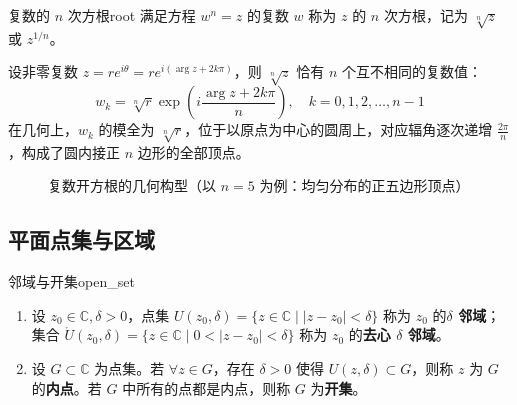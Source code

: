 \documentclass[11pt,a4paper,fontset=fandol]{ctexart}
\theoremstyle{remark}
\begin{document}
\begin{definition}{复数的 $n$ 次方根}{root}
满足方程 $w^n = z$ 的复数 $w$ 称为 $z$ 的 $n$ 次方根，记为 $\sqrt[n]{z}$ 或 $z^{1/n}$。
\end{definition}

设非零复数 $z = r e^{i\theta} = r e^{i(\arg z + 2k\pi)}$，则 $\sqrt[n]{z}$ 恰有 $n$ 个互不相同的复数值：
\begin{equation}
    w_k = \sqrt[n]{r} \exp\left( i \frac{\arg z + 2k\pi}{n} \right), \quad k = 0, 1, 2, \dots, n-1
\end{equation}
在几何上，$w_k$ 的模全为 $\sqrt[n]{r}$，位于以原点为中心的圆周上，对应辐角逐次递增 $\frac{2\pi}{n}$，构成了圆内接正 $n$ 边形的全部顶点。

\begin{figure}[htbp]
\centering
{}
\caption{复数开方根的几何构型（以 $n = 5$ 为例：均匀分布的正五边形顶点）}
\label{fig:roots}
\end{figure}

\subsection{平面点集与区域}

\begin{definition}{邻域与开集}{open_set}
\begin{enumerate}
    \item 设 $z_0 \in \mathbb{C}, \delta > 0$，点集 $U(z_0, \delta) = \{z \in \mathbb{C} \mid |z - z_0| < \delta\}$ 称为 $z_0$ 的\textbf{$\delta$ 邻域}；集合 $\mathring{U}(z_0, \delta) = \{z \in \mathbb{C} \mid 0 < |z - z_0| < \delta\}$ 称为 $z_0$ 的\textbf{去心 $\delta$ 邻域}。
    \item 设 $G \subset \mathbb{C}$ 为点集。若 $\forall z \in G$，存在 $\delta > 0$ 使得 $U(z, \delta) \subset G$，则称 $z$ 为 $G$ 的\textbf{内点}。若 $G$ 中所有的点都是内点，则称 $G$ 为\textbf{开集}。
\end{enumerate}
\end{definition}
\end{document}
